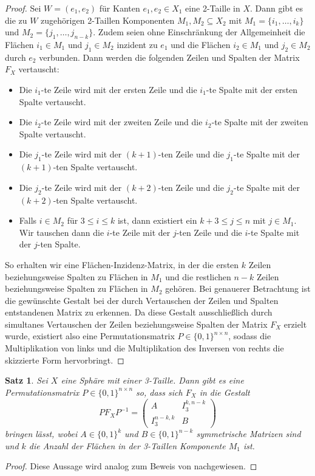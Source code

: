 \documentclass[12pt,titlepage,twoside,cleardoublepage]{article}
\theoremstyle{nummermitklammern}
\newtheorem{satz}[temp]{Satz}
\newtheorem{satz}[zahl]{Satz}
\numberwithin{equation}{section}
\begin{document}
\begin{proof}
Sei $W=(e_1,e_2)$ für Kanten $e_1,e_2\in X_1$ eine 2-Taille in $X.$ Dann gibt es die zu $W$ zugehörigen 2-Taillen Komponenten $M_1,M_2\subseteq X_2$ mit $M_1=\{i_1,\ldots,i_k\}$ und $M_2=\{j_1,\ldots,j_{n-k}\}$. Zudem seien ohne Einschränkung der Allgemeinheit die Flächen $i_1\in M_1$ und $j_1\in M_2$ inzident zu $e_1$ und die Flächen $i_2\in M_1$ und $j_2\in M_2$ durch $e_2$ verbunden. Dann werden die folgenden Zeilen und Spalten der Matrix $F_X$ vertauscht:
\begin{itemize}
\item Die $i_1$-te Zeile wird mit der ersten Zeile und die  $i_1$-te Spalte mit der ersten Spalte vertauscht.
\item Die $i_2$-te Zeile wird mit der zweiten Zeile und die $i_2$-te Spalte mit der zweiten Spalte vertauscht.
\item Die $j_1$-te Zeile wird mit der $(k+1)$-ten Zeile und die $j_1$-te Spalte mit der $(k+1)$-ten Spalte vertauscht.
\item Die $j_2$-te Zeile wird mit der $(k+2)$-ten Zeile und die $j_2$-te Spalte mit der $(k+2)$-ten Spalte vertauscht.
\item Falls $i\in M_2$ für $3\leq i \leq k$ ist, dann existiert ein $k+3\leq j\leq n$ mit $j \in M_1.$ 
Wir tauschen dann die $i$-te Zeile mit der $j$-ten Zeile und die $i$-te Spalte mit der $j$-ten Spalte.
\end{itemize} 
So erhalten wir eine Flächen-Inzidenz-Matrix, in der die ersten $k$ Zeilen beziehungsweise Spalten zu Flächen in $M_1$ und die restlichen $n-k$ Zeilen beziehungsweise Spalten zu Flächen in $M_2$  gehören. Bei genauerer Betrachtung ist die gewünschte Gestalt  bei der durch Vertauschen der Zeilen und Spalten entstandenen Matrix zu erkennen. Da diese Gestalt ausschließlich durch simultanes Vertauschen der Zeilen beziehungsweise Spalten der Matrix $F_X$ erzielt wurde, existiert also eine Permutationsmatrix $P\in\{0,1\}^{n\times n}$, sodass die Multiplikation von links und die Multiplikation des Inversen von rechts  die skizzierte Form hervorbringt.
\end{proof}

\begin{satz}
Sei $X$ eine Sphäre mit einer 3-Taille. Dann gibt es eine Permutationsmatrix $P\in \{0,1\}^{n \times n}$ so, dass sich $F_X$ in die Gestalt 
\[
PF_XP^{-1}=
\left( 
\begin{array}{c|c} 
  A & I^{k,n-k}_3 \\ 
  \hline 
  I^{n-k,k}_3 & B 
\end{array} 
\right)
\] 
bringen lässt, wobei $A\in \{0,1\}^{k}$ und $B\in \{0,1\}^{n-k}$ symmetrische Matrizen sind und $k$ die Anzahl der Flächen in der 3-Taillen Komponente $M_1$ ist.
\end{satz}
\begin{proof}
Diese Aussage wird analog zum Beweis von  nachgewiesen.
\end{proof}
\end{document}
